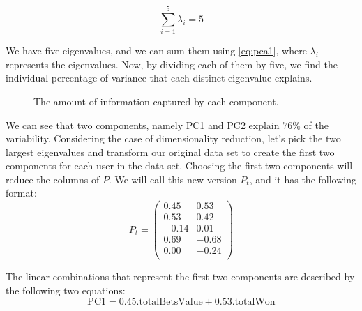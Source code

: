 \documentclass[a4,12pt,twosided,openany]{memoir}
\begin{document}
\begin{equation} \label{eq:pca1}
\sum_{i=1}^5 \lambda_i  = 5
\end{equation}
\par 
\indent
We have five eigenvalues, and we can sum them using \ref{eq:pca1}, where $\lambda_i$ represents the eigenvalues. Now, by dividing each of them by five, we find the individual percentage of variance that each distinct eigenvalue explains.
\begin{figure}[h!]
\begin{center}
\end{center}
\caption{The amount of information captured by each component.}
\end{figure}
\par 
\indent
We can see that two components, namely PC1 and PC2 explain $76\%$ of the variability. Considering the case of dimensionality reduction, let’s pick the two largest eigenvalues and transform our original data set to create the first two components for each user in the data set. Choosing the first two components will reduce the columns of $P$. We will call this new version $P_t$, and it has the following format:
\[P_{t} = 
\begin{pmatrix}
  0.45 & 0.53 \\
  0.53 & 0.42 \\
 -0.14 & 0.01 \\ 
  0.69 & -0.68  \\ 
  0.00 & -0.24  \\
\end{pmatrix}
\]
\par 
\indent
The linear combinations that represent the first two components are described by the following two equations:
\begin{equation}\label{eq:lepca2}
\textrm{PC1} = 0.45.\textrm{totalBetsValue} + 0.53 .\textrm{totalWon} 
\end{equation}
\end{document}
